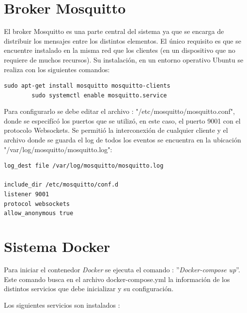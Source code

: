 		
		


\section{Broker Mosquitto}

El broker Mosquitto es una parte central del sistema ya que se encarga de distribuir los mensajes entre los distintos elementos. El único requisito es que se encuentre instalado en la misma red que los clientes (en un dispositivo que no requiere de muchos recursos). Su instalación, en un entorno operativo Ubuntu se realiza con los siguientes comandos:


\begin{lstlisting}[caption=  Instalación/lanzamiento del broker Mosquitto]
		sudo apt-get install mosquitto mosquitto-clients
		sudo systemctl enable mosquitto.service
\end{lstlisting}

Para configurarlo se debe editar el archivo : "/etc/mosquitto/mosquitto.conf", donde se especifícó los puertos que se utilizó, en este caso, el puerto 9001 con el protocolo Websockets. Se permitió la interconexión de cualquier cliente y el archivo donde se guarda el log de todos los eventos se encuentra en la ubicación "/var/log/mosquitto/mosquitto.log":

\begin{lstlisting}[caption=  Contenido archivo mosquitto.conf]
log_dest file /var/log/mosquitto/mosquitto.log

include_dir /etc/mosquitto/conf.d
listener 9001
protocol websockets
allow_anonymous true

\end{lstlisting}



\pagebreak
\section{Sistema Docker}

Para iniciar el contenedor \textit{Docker} se ejecuta el comando : ''\textit{Docker-compose up}''.  Este comando busca en el archivo docker-compose.yml la información de los distintos servicios que debe inicializar y su configuración.

Los siguientes servicios son instalados :

